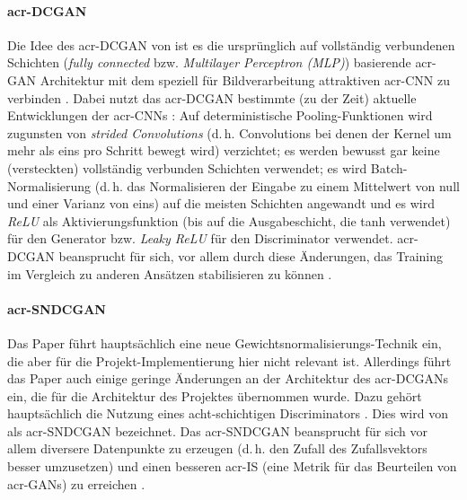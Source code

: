 \paragraph{\gls{acr-DCGAN}} Die Idee des \gls{acr-DCGAN} von
\citeauthor{radford2015unsupervised} \cite{radford2015unsupervised} ist es die
ursprünglich \cite[vgl.][]{goodfellow2014generative} auf vollständig verbundenen
Schichten (\emph{fully connected} bzw. \emph{Multilayer Perceptron (MLP)})
basierende \gls{acr-GAN} Architektur mit dem speziell für Bildverarbeitung
attraktiven \gls{acr-CNN} zu verbinden \cite[S. 1]{radford2015unsupervised}.
Dabei nutzt das \gls{acr-DCGAN} bestimmte (zu der Zeit) aktuelle Entwicklungen
der \gls{acr-CNN}s \cite[vgl.][S. 3]{radford2015unsupervised}: Auf
deterministische Pooling-Funktionen wird zugunsten von \emph{strided
Convolutions} (d.\,h. Convolutions bei denen der Kernel um mehr als eins pro
Schritt bewegt wird) verzichtet; es werden bewusst gar keine (versteckten)
vollständig verbunden Schichten verwendet; es wird Batch-Normalisierung (d.\,h.
das Normalisieren der Eingabe zu einem Mittelwert von null und einer Varianz von
eins) auf die meisten Schichten angewandt und es wird \emph{ReLU} als
Aktivierungsfunktion (bis auf die Ausgabeschicht, die tanh verwendet) für den
Generator bzw. \emph{Leaky ReLU} für den Discriminator verwendet.
\gls{acr-DCGAN} beansprucht für sich, vor allem durch diese Änderungen, das
Training im Vergleich zu anderen Ansätzen stabilisieren zu können \cite[S.
9]{radford2015unsupervised}.

\paragraph{\gls{acr-SNDCGAN}} Das Paper 
\cite{miyato2018spectral} führt hauptsächlich eine neue
Gewichtsnormalisierungs-Technik ein, die aber für die
Pro\-jekt-Imp\-le\-men\-tier\-ung hier nicht relevant ist. Allerdings führt das
Paper auch einige geringe Änderungen an der Architektur des \gls{acr-DCGAN}s
ein, die für die Architektur des Projektes übernommen wurde. Dazu gehört
hauptsächlich die Nutzung eines acht-schichtigen Discriminators \cite[S.
3]{kurach2018gan}. Dies wird von \citeauthor{kurach2018gan} \cite{kurach2018gan}
als \gls{acr-SNDCGAN} bezeichnet. Das \gls{acr-SNDCGAN} beansprucht für sich vor
allem diversere Datenpunkte zu erzeugen (d.\,h. den Zufall des Zufallsvektors
besser umzusetzen) und einen besseren \gls{acr-IS} (eine Metrik für das
Beurteilen von \gls{acr-GAN}s) zu erreichen \cite[S. 11]{miyato2018spectral}.

